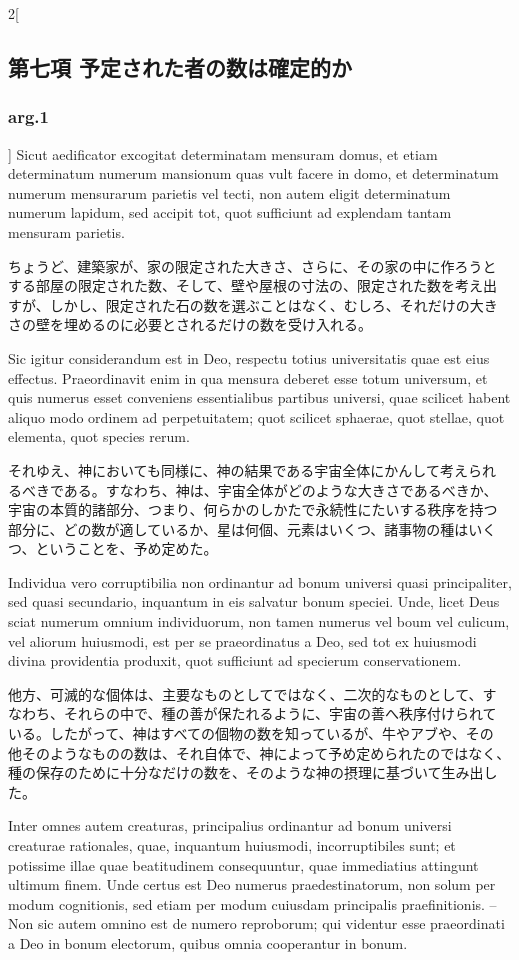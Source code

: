 \documentclass[paper=a4paper,fontsize=10pt,jafontsize=9pt,titlepage]{jlreq}
\begin{document}
\begin{paracol}{2}[\subsection{第七項 予定された者の数は確定的か}\subsubsection{arg.1}]
Sicut aedificator excogitat determinatam
mensuram domus, et etiam determinatum numerum mansionum quas vult facere
in domo, et determinatum numerum mensurarum parietis vel tecti, non
autem eligit determinatum numerum lapidum, sed accipit tot, quot
sufficiunt ad explendam tantam mensuram parietis.


\switchcolumn


ちょうど、建築家が、家の限定された大きさ、さらに、その家の中に作ろうと
する部屋の限定された数、そして、壁や屋根の寸法の、限定された数を考え出
すが、しかし、限定された石の数を選ぶことはなく、むしろ、それだけの大き
さの壁を埋めるのに必要とされるだけの数を受け入れる。


\switchcolumn*


Sic igitur
considerandum est in Deo, respectu totius universitatis quae est eius
effectus. Praeordinavit enim in qua mensura deberet esse totum
universum, et quis numerus esset conveniens essentialibus partibus
universi, quae scilicet habent aliquo modo ordinem ad perpetuitatem;
quot scilicet sphaerae, quot stellae, quot elementa, quot species
rerum.


\switchcolumn


それゆえ、神においても同様に、神の結果である宇宙全体にかんして考えられ
るべきである。すなわち、神は、宇宙全体がどのような大きさであるべきか、
宇宙の本質的諸部分、つまり、何らかのしかたで永続性にたいする秩序を持つ
部分に、どの数が適しているか、星は何個、元素はいくつ、諸事物の種はいく
つ、ということを、予め定めた。


\switchcolumn*


Individua vero corruptibilia non ordinantur ad bonum universi
quasi principaliter, sed quasi secundario, inquantum in eis salvatur
bonum speciei. Unde, licet Deus sciat numerum omnium individuorum, non
tamen numerus vel boum vel culicum, vel aliorum huiusmodi, est per se
praeordinatus a Deo, sed tot ex huiusmodi divina providentia produxit,
quot sufficiunt ad specierum conservationem.


\switchcolumn


他方、可滅的な個体は、主要なものとしてではなく、二次的なものとして、す
なわち、それらの中で、種の善が保たれるように、宇宙の善へ秩序付けられて
いる。したがって、神はすべての個物の数を知っているが、牛やアブや、その
他そのようなものの数は、それ自体で、神によって予め定められたのではなく、
種の保存のために十分なだけの数を、そのような神の摂理に基づいて生み出し
た。


\switchcolumn*


Inter omnes autem
creaturas, principalius ordinantur ad bonum universi creaturae
rationales, quae, inquantum huiusmodi, incorruptibiles sunt; et
potissime illae quae beatitudinem consequuntur, quae immediatius
attingunt ultimum finem. Unde certus est Deo numerus praedestinatorum,
non solum per modum cognitionis, sed etiam per modum cuiusdam
principalis praefinitionis. -- Non sic autem omnino est de numero
reproborum; qui videntur esse praeordinati a Deo in bonum electorum,
quibus omnia cooperantur in bonum.



\end{paracol}
\end{document}
